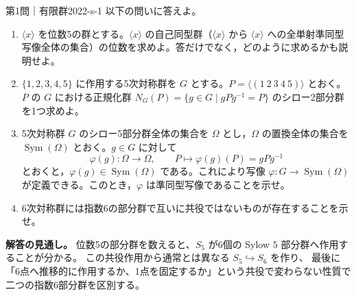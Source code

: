 \begin{problem}{第1問｜有限群}{2022-s-1}
以下の問いに答えよ。
\begin{enumerate}
  \item[(1)] $\langle x\rangle$ を位数5の群とする。$\langle x\rangle$ の自己同型群（$\langle x\rangle$ から $\langle x\rangle$ への全単射準同型写像全体の集合）の位数を求めよ。答だけでなく，どのように求めるかも説明せよ。
  \item[(2)] $\{1,2,3,4,5\}$ に作用する5次対称群を $G$ とする。$P=\langle(1\ 2\ 3\ 4\ 5)\rangle$ とおく。$P$ の $G$ における正規化群 $N_G(P)=\{g\in G\mid gPg^{-1}=P\}$ のシロー2部分群を1つ求めよ。
  \item[(3)] 5次対称群 $G$ のシロー5部分群全体の集合を $\Omega$ とし，$\Omega$ の置換全体の集合を $\operatorname{Sym}(\Omega)$ とおく。$g\in G$ に対して
  \[
  \varphi(g):\Omega\longrightarrow\Omega,\qquad
  P\longmapsto\varphi(g)(P)=gPg^{-1}
  \]
  とおくと，$\varphi(g)\in\operatorname{Sym}(\Omega)$ である。これにより写像 $\varphi:G\to\operatorname{Sym}(\Omega)$ が定義できる。このとき，$\varphi$ は準同型写像であることを示せ。
  \item[(4)] 6次対称群には指数6の部分群で互いに共役ではないものが存在することを示せ。
\end{enumerate}
\end{problem}
\begin{memo*}
\textbf{解答の見通し。}
位数5の部分群を数えると、$S_5$ が6個の Sylow $5$ 部分群へ作用することが分かる。
この共役作用から通常とは異なる $S_5\hookrightarrow S_6$ を作り、
最後に「6点へ推移的に作用するか、1点を固定するか」という共役で変わらない性質で
二つの指数6部分群を区別する。
\end{memo*}
